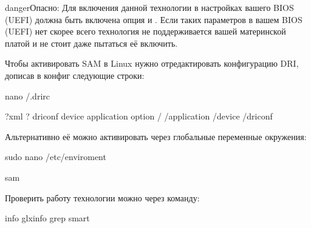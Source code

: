 \documentclass[letterpaper,10pt,russian,openany]{sphinxmanual}
\begin{document}
\begin{sphinxadmonition}{danger}{Опасно:}
\sphinxAtStartPar
Для включения данной технологии в настройках вашего BIOS (UEFI) должна быть включена опция  и .
Если таких параметров в вашем BIOS (UEFI) нет \sphinxhyphen{} скорее всего технология не поддерживается вашей материнской платой и не стоит даже пытаться её включить.
\end{sphinxadmonition}

\sphinxAtStartPar
Чтобы активировать SAM в Linux нужно отредактировать конфигурацию DRI, дописав в конфиг следующие строки:

\begin{sphinxVerbatim}[commandchars=\\\{\}]
nano \PYGZti{}/.drirc 


\PYGZlt{}?xml  ?\PYGZgt{}
\PYGZlt{}driconf\PYGZgt{}
  \PYGZlt{}device\PYGZgt{}
    \PYGZlt{}application \PYGZgt{}
      \PYGZlt{}option   /\PYGZgt{}
    \PYGZlt{}/application\PYGZgt{}
  \PYGZlt{}/device\PYGZgt{}
\PYGZlt{}/driconf\PYGZgt{}
\end{sphinxVerbatim}

\sphinxAtStartPar
Альтернативно её можно активировать через глобальные переменные окружения:

\begin{sphinxVerbatim}[commandchars=\\\{\}]
sudo nano /etc/enviroment 

sam
\end{sphinxVerbatim}

\sphinxAtStartPar
Проверить работу технологии можно через команду:

\begin{sphinxVerbatim}[commandchars=\\\{\}]
info glxinfo  grep smart 
\end{sphinxVerbatim}
\end{document}
